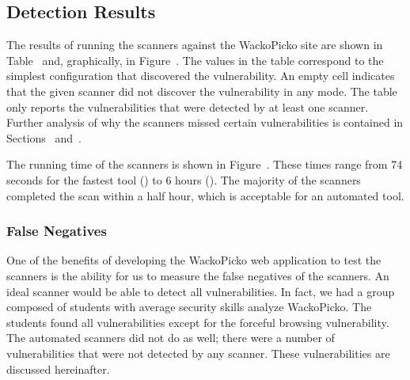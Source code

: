 

\subsection{Detection Results}
The results of running the scanners against the WackoPicko site are
shown in Table~ and, graphically, in
Figure~.
%
The values in the table correspond to the
simplest  configuration that discovered the vulnerability. An empty cell indicates that
the given scanner did not discover the vulnerability in any
mode. The table only reports the vulnerabilities that were detected by at least one scanner.
Further analysis of why the scanners missed
certain vulnerabilities is contained in Sections~
and~. 

The running time of the scanners is shown in Figure~.
These times range from 74 seconds for the fastest tool (\burp{}) to 6
hours (\nstalker{}). The majority of the scanners completed the
scan within a half hour, which is acceptable for an automated tool. 


\subsubsection{False Negatives}

One of the benefits of developing the WackoPicko web application to
test the scanners is the ability for us to measure the false negatives
of the scanners. An ideal scanner would be able to detect all
vulnerabilities. In fact, we had a group composed of students with 
average security skills 
analyze WackoPicko. The students found all vulnerabilities
except for the forceful browsing vulnerability. The automated
scanners did not do as well; there were a number of vulnerabilities
that were not detected by any scanner. These vulnerabilities are
discussed hereinafter.

